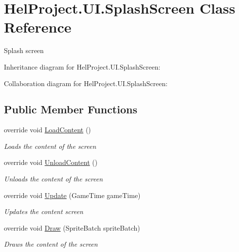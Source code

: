 \hypertarget{class_hel_project_1_1_u_i_1_1_splash_screen}{}\section{Hel\+Project.\+U\+I.\+Splash\+Screen Class Reference}
\label{class_hel_project_1_1_u_i_1_1_splash_screen}


Splash screen  




Inheritance diagram for Hel\+Project.\+U\+I.\+Splash\+Screen\+:


Collaboration diagram for Hel\+Project.\+U\+I.\+Splash\+Screen\+:
\subsection*{Public Member Functions}
\begin{DoxyCompactItemize}
\item 
override void \hyperlink{class_hel_project_1_1_u_i_1_1_splash_screen_a5a20d77a817cf6982efb89576d5e32d0}{Load\+Content} ()
\begin{DoxyCompactList}\small\item\em Loads the content of the screen \end{DoxyCompactList}\item 
override void \hyperlink{class_hel_project_1_1_u_i_1_1_splash_screen_ad00f04421eabaf7b516eddc371350ef2}{Unload\+Content} ()
\begin{DoxyCompactList}\small\item\em Unloads the content of the screen \end{DoxyCompactList}\item 
override void \hyperlink{class_hel_project_1_1_u_i_1_1_splash_screen_abf282bea4e6f1ee8a6ab03f812f130d3}{Update} (Game\+Time game\+Time)
\begin{DoxyCompactList}\small\item\em Updates the content screen \end{DoxyCompactList}\item 
override void \hyperlink{class_hel_project_1_1_u_i_1_1_splash_screen_a5c978af3192a5de1f344e8b16821a2d8}{Draw} (Sprite\+Batch sprite\+Batch)
\begin{DoxyCompactList}\small\item\em Draws the content of the screen \end{DoxyCompactList}\end{DoxyCompactItemize}
